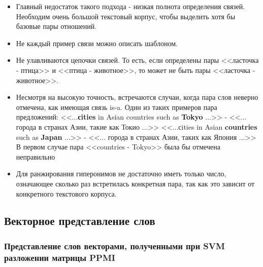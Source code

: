 \begin{itemize}
\item Главный недостаток такого подхода - низкая полнота определения связей. Необходим
очень большой текстовый корпус, чтобы выделить хотя бы базовые пары отношений.
\item Не каждый пример связи можно описать шаблоном.
\item Не улавливаются цепочки связей. То есть, если определены пары <<ласточка - птица>> и
<<птица - животное>>, то может не быть пары <<ласточка - животное>>.
\item Несмотря на высокую точность, встречаются случаи, когда пара слов неверно отмечена,
как имеющая связь is-a. Один из таких примеров пара предложений:
<<...\textbf{сities} in Asian countries such as \textbf{Tokyo} ...>> - <<... города в странах Азии, такие как Токио
...>>
<<...сities in Asian \textbf{countries} such as \textbf{Japan} ...>> - <<... города в странах Азии, таких как
Япония ...>>
В первом случае пара <<countries - Tokyo>> была бы отмечена неправильно
\item Для ранжирования гиперонимов не достаточно иметь только число, означающее сколько
раз встретилась конкретная пара, так как это зависит от конкретного текстового
корпуса.
\end{itemize}

\subsection{Векторное представление слов}

\subsubsection{Представление слов векторами, полученными при SVM разложении матрицы PPMI}

